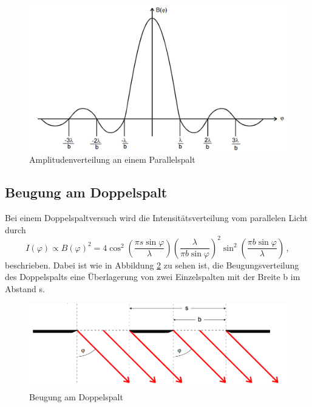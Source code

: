 \begin{figure}
  \centering
  \includegraphics[scale=0.4]{bild3.png}
  \caption{Amplitudenverteilung an einem Parallelspalt\cite{on1}}
  \label{fig:3}
\end{figure}
\subsection{Beugung am Doppelspalt}
Bei einem Doppelspaltversuch wird die Intensitätsverteilung vom parallelen Licht durch
\begin{equation}
 I(\varphi) \propto B(\varphi)^2 = 4\cos^2\left(\frac{\pi s \sin\varphi}{\lambda}\right) \left(\frac{\lambda}{\pi b \sin\varphi}\right)^2
                                    \sin^2\left(\frac{\pi b \sin\varphi}{\lambda}\right) \,,
\label{eqn:aus}
\end{equation}
beschrieben. Dabei ist wie in Abbildung \ref{fig:4} zu sehen ist, die Beugungsverteilung des Doppelspalts
eine Überlagerung von zwei Einzelspalten mit der Breite b im Abstand s.

\begin{figure}
  \centering
  \includegraphics[scale=0.5]{bild4.png}
  \caption{Beugung am Doppelspalt\cite{on1}}
  \label{fig:4}
\end{figure}
